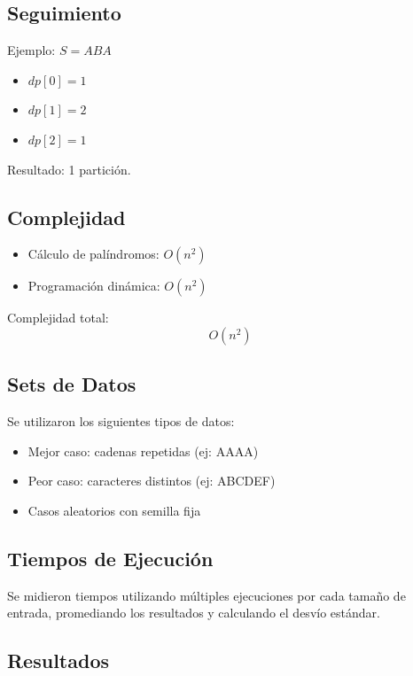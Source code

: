 \subsection{Seguimiento}

Ejemplo: $S = ABA$

\begin{itemize}
    \item $dp[0] = 1$
    \item $dp[1] = 2$
    \item $dp[2] = 1$
\end{itemize}

Resultado: 1 partición.

\subsection{Complejidad}

\begin{itemize}
    \item Cálculo de palíndromos: $O(n^2)$
    \item Programación dinámica: $O(n^2)$
\end{itemize}

Complejidad total:
\[
O(n^2)
\]


\subsection{Sets de Datos}

Se utilizaron los siguientes tipos de datos:

\begin{itemize}
    \item Mejor caso: cadenas repetidas (ej: AAAA)
    \item Peor caso: caracteres distintos (ej: ABCDEF)
    \item Casos aleatorios con semilla fija
\end{itemize}

\subsection{Tiempos de Ejecución}

Se midieron tiempos utilizando múltiples ejecuciones por cada tamaño de entrada, promediando los resultados y calculando el desvío estándar.

\subsection{Resultados}


